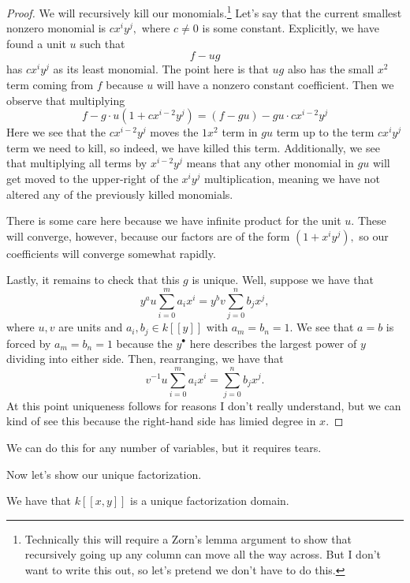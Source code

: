 \documentclass[../notes.tex]{subfiles}
\begin{document}
\begin{proof}
	We will recursively kill our monomials.\footnote{Technically this will require a Zorn's lemma argument to show that recursively going up any column can move all the way across. But I don't want to write this out, so let's pretend we don't have to do this.} Let's say that the current smallest nonzero monomial is $cx^iy^j,$ where $c\ne0$ is some constant. Explicitly, we have found a unit $u$ such that
	\[f-ug\]
	has $cx^iy^j$ as its least monomial. The point here is that $ug$ also has the small $x^2$ term coming from $f$ because $u$ will have a nonzero constant coefficient. Then we observe that multiplying
	\[f-g\cdot u\left(1+cx^{i-2}y^j\right)=\left(f-gu\right)-gu\cdot cx^{i-2}y^j\]
	Here we see that the $cx^{i-2}y^j$ moves the $1x^2$ term in $gu$ term up to the term $cx^iy^j$ term we need to kill, so indeed, we have killed this term. Additionally, we see that multiplying all terms by $x^{i-2}y^j$ means that any other monomial in $gu$ will get moved to the upper-right of the $x^iy^j$ multiplication, meaning we have not altered any of the previously killed monomials.

	There is some care here because we have infinite product for the unit $u.$ These will converge, however, because our factors are of the form $\left(1+x^iy^j\right),$ so our coefficients will converge somewhat rapidly.

	Lastly, it remains to check that this $g$ is unique. Well, suppose we have that
	\[y^au\sum_{i=0}^ma_ix^i=y^bv\sum_{j=0}^nb_jx^j,\]
	where $u,v$ are units and $a_i,b_j\in k[[y]]$ with $a_m=b_n=1.$ We see that $a=b$ is forced by $a_m=b_n=1$ because the $y^\bullet$ here describes the largest power of $y$ dividing into either side. Then, rearranging, we have that
	\[v^{-1}u\sum_{i=0}^ma_ix^i=\sum_{j=0}^nb_jx^j.\]
	At this point uniqueness follows for reasons I don't really understand, but we can kind of see this because the right-hand side has limied degree in $x.$
\end{proof}
\begin{remark}
	We can do this for any number of variables, but it requires tears.
\end{remark}
Now let's show our unique factorization.
\begin{theorem}
	We have that $k[[x,y]]$ is a unique factorization domain.
\end{theorem}
\end{document}
